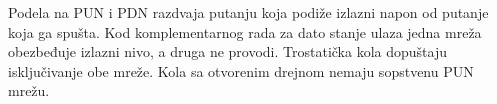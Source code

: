 Podela na PUN i PDN razdvaja putanju koja podiže izlazni napon od putanje koja ga spušta. Kod komplementarnog rada za dato stanje ulaza jedna mreža obezbeđuje izlazni nivo, a druga ne provodi. Trostatička kola dopuštaju isključivanje obe mreže. Kola sa otvorenim drejnom nemaju sopstvenu PUN mrežu.

